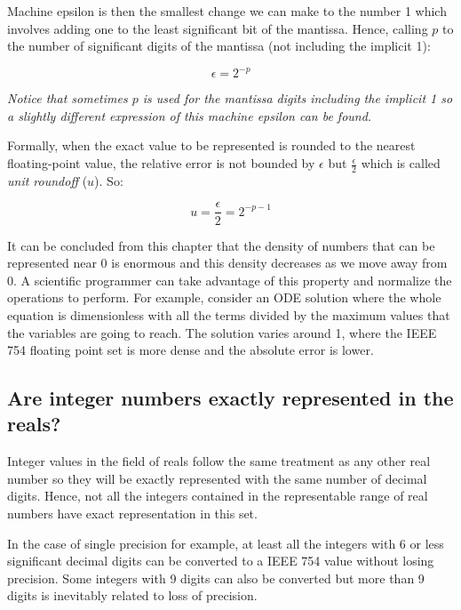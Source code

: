 Machine epsilon is then the smallest change we can make to the number 1 which involves adding one to the least significant bit of the mantissa. 
Hence, calling $p$ to the number of significant digits of the mantissa (not including the implicit 1):

$$
\epsilon = 2^{-p}
$$ 

\textit{Notice that sometimes $p$ is used for the mantissa digits including the implicit 1 so a slightly different expression of this machine epsilon can be found.}

Formally, when the exact value to be represented is rounded to the nearest floating-point value, the relative error is not bounded by $\epsilon$ but $\frac{\epsilon}{2}$ which is called \textit{unit roundoff} ($u$). So:

$$
u = \frac{\epsilon}{2} = 2^{-p-1}
$$






It can be concluded from this chapter that the density of numbers that can be represented near 0 is enormous and this density decreases as 
we move away from 0. A scientific programmer can take advantage of this property and normalize the operations to perform. 
For example, consider an ODE solution where the whole equation is dimensionless with all the terms divided by the 
maximum values that the variables are going to reach. The solution varies around 1, where the IEEE 754 floating point 
set is more dense and the absolute error is lower. 




        \subsection{Are integer numbers exactly represented in the reals?}


Integer values in the field of reals follow the same treatment as any other real number so they will be exactly represented with the same number of decimal digits. Hence, not all the integers contained in the representable range of real numbers have exact representation in this set. 

In the case of single precision for example, at least all the integers with 6 or less significant decimal digits can be converted to a IEEE 754 value without losing precision. Some integers with 9 digits can also be converted but more than 9 digits is inevitably related to loss of precision. 


